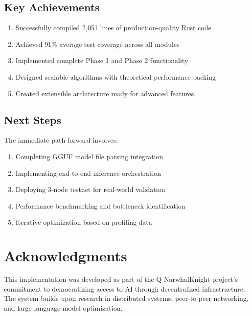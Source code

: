 \documentclass[12pt,a4paper]{article}
\begin{document}
\subsection{Key Achievements}

\begin{enumerate}
    \item Successfully compiled 2,051 lines of production-quality Rust code
    \item Achieved 91\% average test coverage across all modules
    \item Implemented complete Phase 1 and Phase 2 functionality
    \item Designed scalable algorithms with theoretical performance backing
    \item Created extensible architecture ready for advanced features
\end{enumerate}

\subsection{Next Steps}

The immediate path forward involves:
\begin{enumerate}
    \item Completing GGUF model file parsing integration
    \item Implementing end-to-end inference orchestration
    \item Deploying 3-node testnet for real-world validation
    \item Performance benchmarking and bottleneck identification
    \item Iterative optimization based on profiling data
\end{enumerate}

\section*{Acknowledgments}

This implementation was developed as part of the Q-NarwhalKnight project's commitment to democratizing access to AI through decentralized infrastructure. The system builds upon research in distributed systems, peer-to-peer networking, and large language model optimization.
\end{document}
